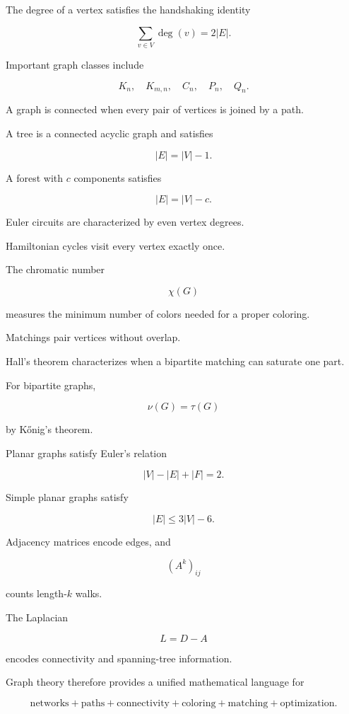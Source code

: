 The degree of a vertex satisfies the handshaking identity

\[
\boxed{
\sum_{v\in V}\deg(v)=2|E|.
}
\]

Important graph classes include

\[
\boxed{
K_n,
\quad
K_{m,n},
\quad
C_n,
\quad
P_n,
\quad
Q_n.
}
\]

A graph is connected when every pair of vertices is joined by a path.

A tree is a connected acyclic graph and satisfies

\[
\boxed{
|E|=|V|-1.
}
\]

A forest with \(c\) components satisfies

\[
\boxed{
|E|=|V|-c.
}
\]

Euler circuits are characterized by even vertex degrees.

Hamiltonian cycles visit every vertex exactly once.

The chromatic number

\[
\boxed{
\chi(G)
}
\]

measures the minimum number of colors needed for a proper coloring.

Matchings pair vertices without overlap.

Hall's theorem characterizes when a bipartite matching can saturate one
part.

For bipartite graphs,

\[
\boxed{
\nu(G)=\tau(G)
}
\]

by K\H{o}nig's theorem.

Planar graphs satisfy Euler's relation

\[
\boxed{
|V|-|E|+|F|=2.
}
\]

Simple planar graphs satisfy

\[
\boxed{
|E|\leq3|V|-6.
}
\]

Adjacency matrices encode edges, and

\[
\boxed{
(A^k)_{ij}
}
\]

counts length-\(k\) walks.

The Laplacian

\[
\boxed{
L=D-A
}
\]

encodes connectivity and spanning-tree information.

Graph theory therefore provides a unified mathematical language for

\[
\boxed{
\text{networks}
+
\text{paths}
+
\text{connectivity}
+
\text{coloring}
+
\text{matching}
+
\text{optimization}.
}
\]

